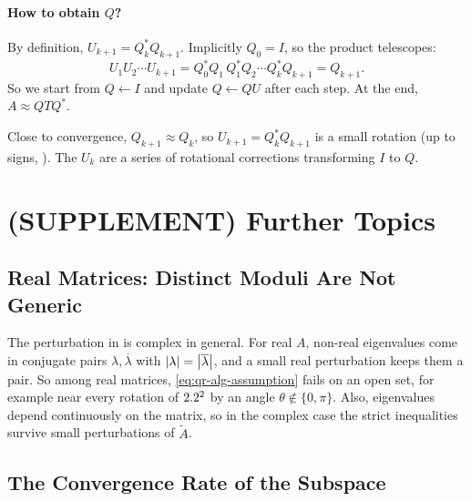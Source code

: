 \paragraph{How to obtain $Q$?} By definition, $U_{k+1} = Q_k^\ast Q_{k+1}$. Implicitly $Q_0 = I$, so the product telescopes:
\begin{equation}
  U_1U_2\cdots U_{k+1} = Q_0^\ast Q_1\,Q_1^\ast Q_2\cdots Q_k^\ast Q_{k+1} = Q_{k+1}.
\end{equation}
So we start from $Q \gets I$ and update $Q \gets QU$ after each step. At the end, $A \approx QTQ^\ast$.

Close to convergence, $Q_{k+1} \approx Q_k$, so $U_{k+1} = Q_k^\ast Q_{k+1}$ is a small rotation (up to signs, ). The $U_k$ are a series of rotational corrections transforming $I$ to $Q$.

\section{(SUPPLEMENT) Further Topics}
\label{sec:qr-alg-supp}

\subsection{Real Matrices: Distinct Moduli Are Not Generic}
\label{sec:qr-alg-real-generic}

The perturbation in  is complex in general. For real $A$, non-real eigenvalues come in conjugate pairs $\lambda, \overline{\lambda}$ with $\left\lvert \lambda \right\rvert = \left\lvert \overline{\lambda} \right\rvert$, and a small real perturbation keeps them a pair. So among real matrices, \cref{eq:qr-alg-assumption} fails on an open set, for example near every rotation of $2.2^2$ by an angle $\theta \notin \{0, \pi\}$. Also, eigenvalues depend continuously on the matrix, so in the complex case the strict inequalities survive small perturbations of $\tilde{A}$.

\subsection{The Convergence Rate of the Subspace}
\label{sec:orth-iter-conv-precise}

